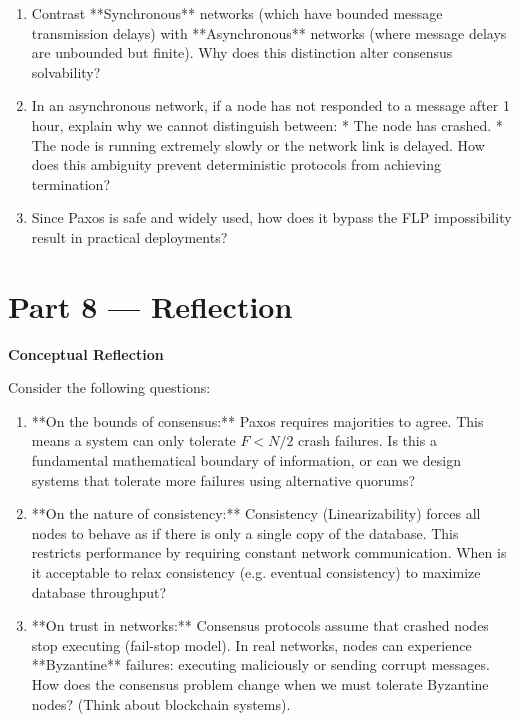 \documentclass[12pt, a4paper]{book}
\begin{document}
\begin{deepbox}
\begin{enumerate}[label=\textbf{D\arabic*.}]
        \begin{enumerate}[label=(\alph*)]
          \item Contrast **Synchronous** networks (which have bounded message transmission delays) with **Asynchronous** networks (where message delays are unbounded but finite).
                Why does this distinction alter consensus solvability?
          \item In an asynchronous network, if a node has not responded to a message after 1 hour, explain why we cannot distinguish between:
                * The node has crashed.
                * The node is running extremely slowly or the network link is delayed.
                How does this ambiguity prevent deterministic protocols from achieving termination?
          \item Since Paxos is safe and widely used, how does it bypass the FLP impossibility result in practical deployments?
        \end{enumerate}
\end{enumerate}
\end{deepbox}

\newpage

\section{Part 8 --- Reflection}

\begin{reflectionbox}
\textbf{Conceptual Reflection}

Consider the following questions:
\begin{enumerate}
  \item **On the bounds of consensus:** Paxos requires majorities to agree. This means a system can only tolerate $F < N/2$ crash failures. Is this a fundamental mathematical boundary of information, or can we design systems that tolerate more failures using alternative quorums?
  \item **On the nature of consistency:** Consistency (Linearizability) forces all nodes to behave as if there is only a single copy of the database. This restricts performance by requiring constant network communication. When is it acceptable to relax consistency (e.g. eventual consistency) to maximize database throughput?
  \item **On trust in networks:** Consensus protocols assume that crashed nodes stop executing (fail-stop model). In real networks, nodes can experience **Byzantine** failures: executing maliciously or sending corrupt messages. How does the consensus problem change when we must tolerate Byzantine nodes? (Think about blockchain systems).
\end{enumerate}
\end{reflectionbox}
\end{document}
